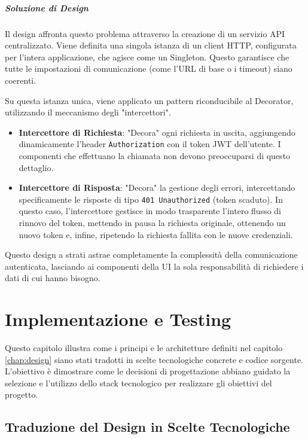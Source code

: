 \documentclass[12pt,a4paper,openright,twoside]{book}
\begin{document}
\paragraph{Soluzione di Design}
Il design affronta questo problema attraverso la creazione di un servizio API centralizzato. Viene definita una singola istanza di un client HTTP, configurata per l'intera applicazione, che agisce come un Singleton. Questo garantisce che tutte le impostazioni di comunicazione (come l'URL di base o i timeout) siano coerenti.

Su questa istanza unica, viene applicato un pattern riconducibile al Decorator, utilizzando il meccanismo degli "intercettori".
\begin{itemize}
    \item \textbf{Intercettore di Richiesta}: "Decora" ogni richiesta in uscita, aggiungendo dinamicamente l'header \texttt{Authorization} con il token JWT dell'utente. I componenti che effettuano la chiamata non devono preoccuparsi di questo dettaglio.
    \item \textbf{Intercettore di Risposta}: "Decora" la gestione degli errori, intercettando specificamente le risposte di tipo \texttt{401 Unauthorized} (token scaduto). In questo caso, l'intercettore gestisce in modo trasparente l'intero flusso di rinnovo del token, mettendo in pausa la richiesta originale, ottenendo un nuovo token e, infine, ripetendo la richiesta fallita con le nuove credenziali.
\end{itemize}
Questo design a strati astrae completamente la complessità della comunicazione autenticata, lasciando ai componenti della UI la sola responsabilità di richiedere i dati di cui hanno bisogno.

\chapter{Implementazione e Testing}
\label{chap:implementazione}

Questo capitolo illustra come i principi e le architetture definiti nel capitolo \ref{chap:design} siano stati tradotti in scelte tecnologiche concrete e codice sorgente. L'obiettivo è dimostrare come le decisioni di progettazione abbiano guidato la selezione e l'utilizzo dello stack tecnologico per realizzare gli obiettivi del progetto.

\section{Traduzione del Design in Scelte Tecnologiche}
\label{sec:impl_tech_choices}
\end{document}
